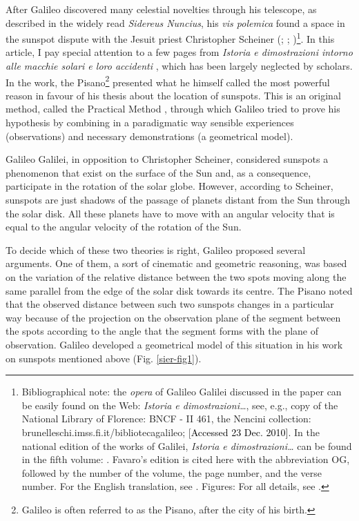 \begin{artengenv}
\lettrine[loversize=0.13,lines=2,lraise=-0.03,nindent=0em,findent=0.2pt]%
{A}{}fter Galileo discovered many celestial novelties through his telescope, as described in the widely read
\textit{Sidereus Nuncius}, his \textit{vis polemica} found a space in the sunspot dispute with the Jesuit priest
Christopher Scheiner (\cite[pp.238–259]{camerota_galileo_2004}; \cite[chap.2.6]{fantoli_galileo:_2003};
\cite{heilbron_galileo_2010,galilei_sunspots_2010-1,shea_galileo_1970,sierotowicz_o_2013})\footnote{Bibliographical note: the
\textit{opera} of Galileo Galilei discussed in the paper can be easily found on the Web: \textit{Istoria e
dimostrazioni\ldots}, \parencite{galilei_istoria_1613} see, e.g., copy of the National Library of Florence: BNCF -
II 461, the Nencini collection: brunelleschi.imss.fi.it/bibliotecagalileo; [\textcolor{black}{Accessed 23 Dec. 2010]}.
In the national edition of the works of Galilei, \textit{Istoria e dimostrazioni\ldots} can be found in the fifth volume:
\parencite[pp.25–239]{favaro_opere_1895}.
Favaro’s edition is cited here with the abbreviation OG, followed
by the number of the volume, the page number, and the verse number. For the English translation, see
\parencite{galilei_sunspots_2010}. Figures: For all details, see
\parencite{sierotowicz_o_2013}.
}. In this article, I pay special attention to a few pages from \textit{Istoria e dimostrazioni intorno alle macchie
solari e loro accidenti}
\parencite{galilei_istoria_1613},
which has been largely neglected by scholars. In the
work, the Pisano\footnote{Galileo is often referred to as the Pisano, after the city of his birth.} presented what he
himself called the most powerful reason in favour of his thesis about the location of sunspots. This is an original
method, called the Practical Method
\parencite[see OG V, 121.5;][p.112]{galilei_sunspots_2010},
through which
Galileo tried to prove his hypothesis by combining in a paradigmatic way sensible experiences (observations) and
necessary demonstrations (a geometrical model).

Galileo Galilei, in opposition to Christopher Scheiner, considered sunspots a phenomenon that exist on the surface of
the Sun and, as a consequence, participate in the rotation of the solar globe. However, according to Scheiner, sunspots
are just shadows of the passage of planets distant from the Sun through the solar disk. All these planets have to move
with an angular velocity that is equal to the angular velocity of the rotation of the Sun.

To decide which of these two theories is right, Galileo proposed several arguments. One of them, a sort of cinematic and
geometric reasoning, was based on the variation of the relative distance between the two spots moving along the same
parallel from the edge of the solar disk towards its centre. The Pisano noted that the observed distance between such
two sunspots changes in a particular way because of the projection on the observation plane of the segment between the
spots according to the angle that the segment forms with the plane of observation. Galileo developed a geometrical
model of this situation in his work on sunspots mentioned above (Fig. \ref{sier-fig1}). 


\end{artengenv}
